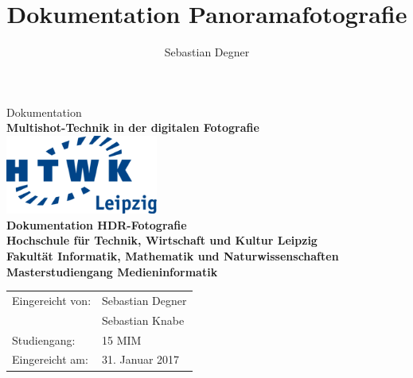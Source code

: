 \documentclass[liststotoc,bibtotoc,fontsize=14pt,]{scrreprt}
\title{Dokumentation Panoramafotografie}
\author{Sebastian Degner}
\begin{document}
	
	\begin{titlepage}
		\begin{center}
			\vspace{2cm}
			Dokumentation\\ \textbf{Multishot-Technik in der digitalen Fotografie}\\ 
			\vspace{2,5cm}
			\includegraphics[width=5cm]{HTWK_Logo_RGB-transparent_250.png}\\
			
			\vspace{2,5cm}
			\huge \textbf{\textsf{Dokumentation HDR-Fotografie}} \\
			\vspace{3cm}
			\fontsize{15}{18} \textbf{Hochschule für Technik, Wirtschaft und Kultur
				Leipzig\\ Fakultät Informatik, Mathematik und Naturwissenschaften\\   Masterstudiengang Medieninformatik}\\
			\vspace{3cm}
		\end{center}
		\normalsize{
			\begin{tabular}{ll}
				Eingereicht von: & {Sebastian Degner} \\
				 & {Sebastian Knabe} \\
				Studiengang: & 15 MIM\\
				Eingereicht am: & 31. Januar 2017 \\
			\end{tabular}\\
		}
		
	\end{titlepage}
	
	\tableofcontents
	\clearpage
	\listoffigures
\end{document}
